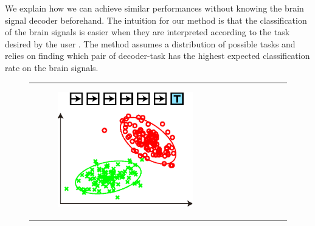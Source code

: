 \documentclass[]{article}
\begin{document}
We explain how we can achieve similar performances without knowing the brain signal decoder beforehand. The intuition for our method  is that the classification of the brain signals is easier when they are interpreted according to the task desired by the user \cite{grizou2014calibration}. The method assumes a distribution of possible tasks and relies on finding which pair of decoder-task has the highest expected classification rate on the brain signals.

\label{sec:Algorithm}
\begin{figure}[!ht]
\centering
    \begin{tabular}{c|c|c}
        \begin{subfigure}[t]{0.29\columnwidth}
            \begin{flushleft}
            \includegraphics[width=\columnwidth]{img/GM1}
            \caption{}
            \label{fig:GM1}
            \end{flushleft}
        \end{subfigure}
        &
        \begin{subfigure}[t]{0.29\columnwidth}
            \begin{center}

\end{center}
\end{subfigure}
\end{tabular}
\end{figure}
\end{document}
